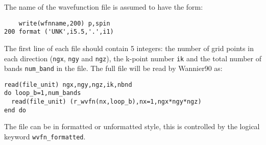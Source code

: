 The name of the wavefunction file is assumed to have the form:

\begin{verbatim}
    write(wfnname,200) p,spin
200 format ('UNK',i5.5,'.',i1)
\end{verbatim}

The first line of each file should contain 5 integers: the number of
 grid points in each direction (\verb#ngx#, \verb#ngy# and
 \verb#ngz#), the k-point number \verb#ik# and the total number of
 bands \verb#num_band# in the file. The full file will be read by Wannier90 as:

\begin{verbatim}
read(file_unit) ngx,ngy,ngz,ik,nbnd
do loop_b=1,num_bands
  read(file_unit) (r_wvfn(nx,loop_b),nx=1,ngx*ngy*ngz)
end do
\end{verbatim}

The file can be in formatted or unformatted style, this is controlled
by the logical keyword \verb#wvfn_formatted#. 



